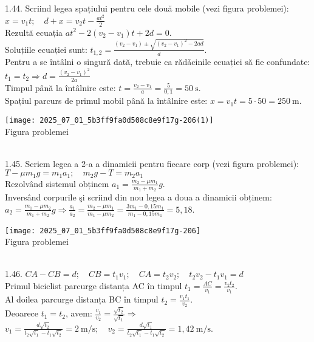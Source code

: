 1.44. Scriind legea spațiului pentru cele două mobile (vezi figura problemei):\\ $x=v_{1} t; \quad d+x=v_{2} t-\frac{a t^{2}}{2}$\\ Rezultă ecuația $a t^{2}-2\left(v_{2}-v_{1}\right) t+2 d=0$.\\ Soluțiile ecuației sunt: $t_{1,2}=\frac{\left(v_{2}-v_{1}\right) \pm \sqrt{\left(v_{2}-v_{1}\right)^{2}-2 a d}}{d}$.\\ Pentru a se întâlni o singură dată, trebuie ca rădǎcinile ecuației să fie confundate: $t_{1}=t_{2} \Rightarrow d=\frac{\left(v_{2}-v_{1}\right)^{2}}{2 a}$\\ Timpul până la întâlnire este: $t=\frac{v_{2}-v_{1}}{a}=\frac{5}{0,1}=50 \mathrm{~s}$.\\ Spațiul parcurs de primul mobil până la întâlnire este: $x=v_{1} t=5 \cdot 50=250 \mathrm{~m}$.\\ \begin{center} \texttt{[image: 2025\_07\_01\_5b3ff9fa0d508c8e9f17g-206(1)]}\\ Figura problemei \end{center}\\

1.45. Scriem legea a 2-a a dinamicii pentru fiecare corp (vezi figura problemei):\\ $T-\mu m_{1} g=m_{1} a_{1}; \quad m_{2} g-T=m_{2} a_{1}$\\ Rezolvând sistemul obținem $a_{1}=\frac{m_{2}-\mu m_{1}}{m_{1}+m_{2}} g$.\\ Inversând corpurile şi scriind din nou legea a doua a dinamicii obținem:\\ $a_{2}=\frac{m_{1}-\mu m_{2}}{m_{1}+m_{2}} g \Rightarrow \frac{a_{1}}{a_{2}}=\frac{m_{2}-\mu m_{1}}{m_{1}-\mu m_{2}}=\frac{3 m_{1}-0,15 m_{1}}{m_{1}-0,15 m_{1}}=5,18$.\\ \begin{center} \texttt{[image: 2025\_07\_01\_5b3ff9fa0d508c8e9f17g-206]}\\ Figura problemei \end{center}\\

1.46. $CA-CB=d; \quad CB=t_{1} v_{1}; \quad CA=t_{2} v_{2}; \quad t_{2} v_{2}-t_{1} v_{1}=d$\\ Primul biciclist parcurge distanța AC în timpul $t_{1}=\frac{A C}{v_{1}}=\frac{v_{2} t_{2}}{v_{1}}$.\\ Al doilea parcurge distanța BC în timpul $t_{2}=\frac{v_{1} t_{1}}{v_{2}}$.\\ Deoarece $t_{1}=t_{2}$, avem: $\frac{v_{1}}{v_{2}}=\frac{\sqrt{t_{2}}}{\sqrt{t_{1}}} \Rightarrow$\\ $v_{1}=\frac{d \sqrt{t_{2}}}{t_{2} \sqrt{t_{1}}-t_{1} \sqrt{t_{2}}}=2 \mathrm{~m} / \mathrm{s}; \quad v_{2}=\frac{d \sqrt{t_{1}}}{t_{2} \sqrt{t_{1}}-t_{1} \sqrt{t_{2}}}=1,42 \mathrm{~m} / \mathrm{s}$.\\

